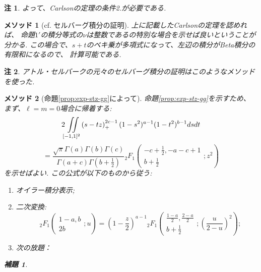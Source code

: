 \documentclass[12pt]{article} %
\newtheorem*{lemma*}{補題}
\newtheorem*{remark*}{\textbf{注}}
\newtheorem{method}{\textbf{メソッド}}
\theoremstyle{remark}
\begin{document}
{\begin{remark*}
	よって、Carlsonの定理の条件2.が必要である.
\end{remark*}
\begin{method}[cf. セルバーグ積分の証明]
	上に記載したCarlsonの定理を認めれば、
命題$1'$の積分等式の$\nu$は整数であるの特別な場合を示せば良いということが分かる.
この場合で、$s+t$のベキ乗が多項式になって、左辺の積分がBeta積分の有限和になるので、
計算可能である.
\end{method}
\begin{remark*}
アトル・セルバークの元々のセルバーグ積分の証明はこのようなメソッドを使った.
\end{remark*}
\begin{method}[命題\ref{prop:exp-stz-gg}によって]
	命題\ref{prop:exp-stz-gg}を示すため、
まず、$\ell=m=0$場合に帰着する:
			\begin{equation*}
				 2\iint\displaylimits_{[-1,1]^2} \left( s-tz \right)_+^{2c-1}  (1 - s^2)^{a - 1} (1 -
				t^2)^{b - 1} d s d t
			\end{equation*}
			\begin{equation} =
				\frac{\sqrt{\pi} \Gamma (a) \Gamma (b) \Gamma
			(c)}{\Gamma (a + c) \Gamma \left( b + \frac{1}{2} \right)} {}_2 F_1 \left(
			\begin{array}{c}
				  - c + \frac{1}{2}, - a - c + 1\\
				    b + \frac{1}{2}
			    \end{array} ; z^2 \right)
				\label{eqn:prop21}
			\end{equation}
			を示せばよい.
	この公式が以下のものから従う:
	\begin{enumerate}
		\item オイラー積分表示;
		\item 二次変換:
			\begin{equation*}
			\quad {}_2 F_1 \left( \begin{array}{c}
				  1 - a, b\\
				    2 b
			    \end{array} ; u \right) = \left( 1 - \frac{z}{2} \right)^{a - 1} {}_2 F_1 \left(
			    \begin{array}{c}
				      \frac{1 - a}{2}, \frac{2 - a}{2}\\
					b + \frac{1}{2}
				\end{array} ; \left( \frac{u}{2 - u} \right)^2 \right);
			\end{equation*}
		\item 次の放題：
	\end{enumerate}
			\begin{lemma*}
				

\end{lemma*}
\end{method}}
\end{document}
